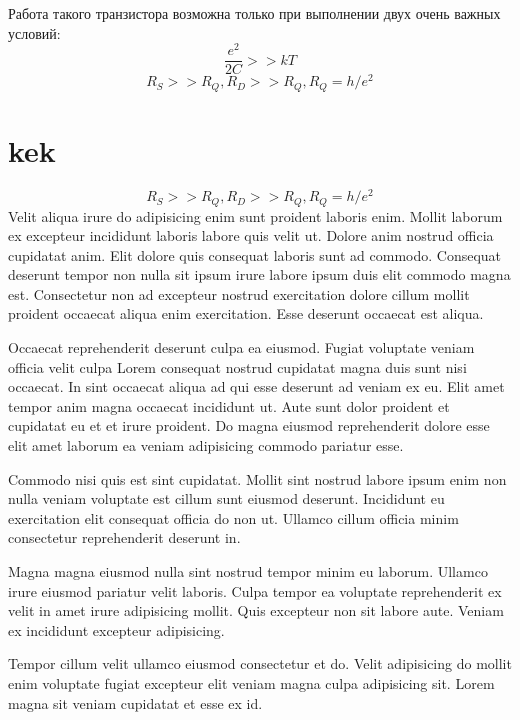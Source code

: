 \documentclass[12pt,a4paper]{report}
\begin{document}
Работа такого транзистора возможна только при выполнении двух очень важных условий:
\begin{equation}\label{c1}
\frac{e^2}{2C} >> kT
\end{equation}
\begin{equation}\label{c2}
R_S >> R_Q, R_D >> R_Q,  R_Q = h/e^2
\end{equation}
\section{kek}
\begin{equation}\label{c3}
R_S >> R_Q, R_D >> R_Q,  R_Q = h/e^2
\end{equation}
Velit aliqua irure do adipisicing enim sunt proident laboris enim. Mollit laborum ex excepteur incididunt laboris labore quis velit ut. Dolore anim nostrud officia cupidatat anim. Elit dolore quis consequat laboris sunt ad commodo. Consequat deserunt tempor non nulla sit ipsum irure labore ipsum duis elit commodo magna est. Consectetur non ad excepteur nostrud exercitation dolore cillum mollit proident occaecat aliqua enim exercitation. Esse deserunt occaecat est aliqua.

Occaecat reprehenderit deserunt culpa ea eiusmod. Fugiat voluptate veniam officia velit culpa Lorem consequat nostrud cupidatat magna duis sunt nisi occaecat. In sint occaecat aliqua ad qui esse deserunt ad veniam ex eu. Elit amet tempor anim magna occaecat incididunt ut. Aute sunt dolor proident et cupidatat eu et et irure proident. Do magna eiusmod reprehenderit dolore esse elit amet laborum ea veniam adipisicing commodo pariatur esse.

Commodo nisi quis est sint cupidatat. Mollit sint nostrud labore ipsum enim non nulla veniam voluptate est cillum sunt eiusmod deserunt. Incididunt eu exercitation elit consequat officia do non ut. Ullamco cillum officia minim consectetur reprehenderit deserunt in.

Magna magna eiusmod nulla sint nostrud tempor minim eu laborum. Ullamco irure eiusmod pariatur velit laboris. Culpa tempor ea voluptate reprehenderit ex velit in amet irure adipisicing mollit. Quis excepteur non sit labore aute. Veniam ex incididunt excepteur adipisicing.

Tempor cillum velit ullamco eiusmod consectetur et do. Velit adipisicing do mollit enim voluptate fugiat excepteur elit veniam magna culpa adipisicing sit. Lorem magna sit veniam cupidatat et esse ex id.
\end{document}
